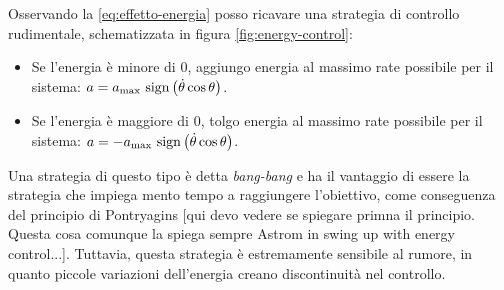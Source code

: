Osservando la \eqref{eq:effetto-energia} posso ricavare una strategia di controllo rudimentale, schematizzata in figura \ref{fig:energy-control}:
\begin{itemize}
    \item Se l'energia è minore di $0$, aggiungo energia al massimo rate possibile per il sistema: $a = a_{\max}\ \mathrm{sign}\left(\dot \theta \cos \theta\right)$.
    \item Se l'energia è maggiore di $0$, tolgo energia al massimo rate possibile per il sistema: $a = -a_{\max}\ \mathrm{sign}\left(\dot \theta \cos \theta\right)$.
\end{itemize}
Una strategia di questo tipo è detta \emph{bang-bang} e ha il vantaggio di essere
la strategia che impiega mento tempo a raggiungere l'obiettivo,
come conseguenza del principio di Pontryagins [qui devo vedere se spiegare primna il principio. Questa cosa comunque la spiega sempre Astrom in swing up with energy control...].
Tuttavia, questa strategia è estremamente sensibile al rumore,
in quanto piccole variazioni dell'energia creano discontinuità nel controllo.

